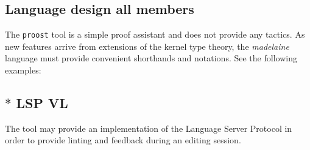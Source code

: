 \documentclass[twocolumn]{article}
\begin{document}
\subsection{Language design \hfill\scriptsize all members}
The \texttt{proost} tool is a simple proof assistant and does not provide any
tactics. As new features arrive from extensions of the kernel type theory, the
\emph{madelaine} language must provide convenient shorthands and notations. See
the following examples:



\subsection{\(*\) LSP \hfill\scriptsize VL}
The tool may provide an implementation of the Language Server Protocol in
order to provide linting and feedback during an editing session.

\end{document}
